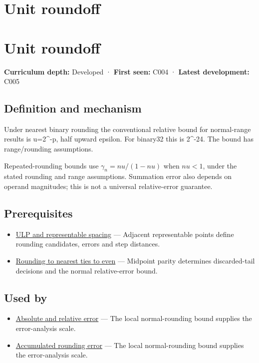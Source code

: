 \hypertarget{appendix-bc44f7b42f42}{}
\section*{Unit roundoff}
\section{Unit roundoff}\label{appendix-bc44f7b42f42-unit-roundoff}

\textbf{Curriculum depth:} Developed · \textbf{First seen:} C004 · \textbf{Latest development:} C005

\subsection{Definition and mechanism}\label{appendix-bc44f7b42f42-definition-and-mechanism}

Under nearest binary rounding the conventional relative bound for normal-range results is u=2\^{}-p, half upward epsilon. For binary32 this is 2\^{}-24. The bound has range/rounding assumptions.

Repeated-rounding bounds use \(\gamma_n=nu/(1-nu)\) when \(nu<1\), under the stated rounding and range assumptions. Summation error also depends on operand magnitudes; this is not a universal relative-error guarantee.

\subsection{Prerequisites}\label{appendix-bc44f7b42f42-prerequisites}

\begin{itemize}
\tightlist
\item
  \hyperref[appendix-14bab4cab9d4]{ULP and representable spacing} --- Adjacent representable points define rounding candidates, errors and step distances.
\item
  \hyperref[appendix-614afe1de592]{Rounding to nearest ties to even} --- Midpoint parity determines discarded-tail decisions and the normal relative-error bound.
\end{itemize}

\subsection{Used by}\label{appendix-bc44f7b42f42-used-by}

\begin{itemize}
\tightlist
\item
  \hyperref[appendix-3ae74e89b4e6]{Absolute and relative error} --- The local normal-rounding bound supplies the error-analysis scale.
\item
  \hyperref[appendix-f82e270791c8]{Accumulated rounding error} --- The local normal-rounding bound supplies the error-analysis scale.
\end{itemize}

